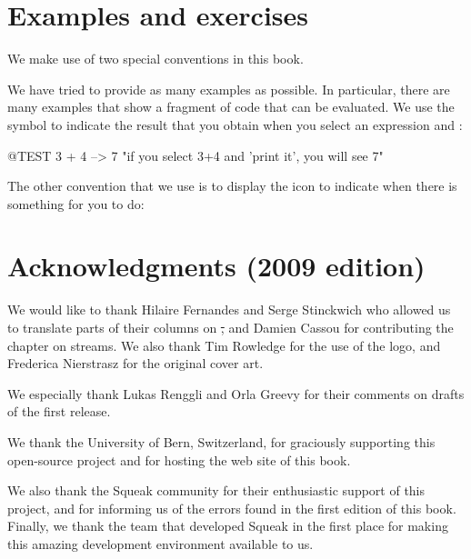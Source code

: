 \documentclass[a4paper,10pt,twoside]{book}
\begin{document}
\section*{Examples and exercises}

We make use of two special conventions in this book.

We have tried to provide as many examples as possible.
In particular, there are many examples that show a fragment of code that can be evaluated.
We use the symbol \ct{-->} to indicate the result that you obtain when you select an expression and :

\begin{code}{@TEST}
3 + 4 --> 7    "if you select 3+4 and 'print it', you will see 7"
\end{code}


The other convention that we use is to display the icon \dothisicon{} to indicate when there is something for you to do:


\section*{Acknowledgments (2009 edition)}

We would like to thank Hilaire Fernandes and Serge Stinckwich who allowed us to translate parts of their columns on \st, and Damien Cassou for contributing the chapter on streams.
We also thank Tim Rowledge for the use of the \sq logo, and Frederica Nierstrasz for the original cover art.

We especially thank Lukas Renggli and Orla Greevy for their comments on drafts of the first release.

We thank the University of Bern, Switzerland, for graciously supporting this open-source project and for hosting the web site of this book.

We also thank the Squeak community for their enthusiastic support of this project, and for informing us of the errors found in the first edition of this book.
Finally, we thank the team that developed Squeak in the first place for making this amazing development environment available to us.

\ifx\wholebook\relax\else
   
   
\end{document}
